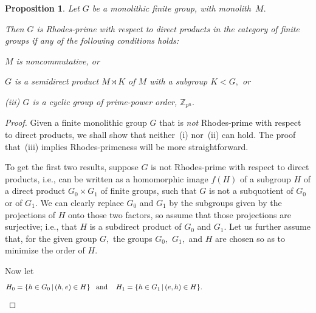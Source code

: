 \documentclass{amsart}
\newtheorem{proposition}[theorem]{Proposition}
\numberwithin{equation}{section}
\numberwithin{theorem}{section}
\newcommand{\Z}{\mathbb{Z}}
\begin{document}
\begin{proposition}\label{P.x-prime}
Let $G$ be a monolithic finite group, with monolith~$M.$

Then $G$ is Rhodes-prime with respect to direct products
in the category of finite groups if any
of the following conditions holds:

\hspace{.5em}{\rm(i)} $M$ is noncommutative, or

\hspace{.25em}{\rm(ii)} $G$ is a semidirect product
$M\rtimes K$ of $M$ with a subgroup $K<G,$ or

{\rm(iii)} $G$ is a cyclic group of prime-power order, $\Z_{p^n}.$
\end{proposition}

\begin{proof}
Given a finite monolithic
group $G$ that is {\em not} Rhodes-prime with respect to
direct products, we shall show that neither~(i) nor~(ii) can hold.
The proof that~(iii) implies Rhodes-primeness will be more
straightforward.

To get the first two results, suppose $G$
is not Rhodes-prime with respect to direct products, i.e.,
can be written as a homomorphic image $f(H)$ of a subgroup $H$ of
a direct product $G_0\times G_1$ of finite groups, such that
$G$ is not a subquotient of $G_0$ or of $G_1.$
We can clearly replace $G_0$ and $G_1$ by
the subgroups given by the projections of $H$ onto those two factors,
so assume that those projections are
surjective; i.e., that $H$ is a subdirect product of $G_0$ and $G_1.$
Let us further assume that, for the given
group $G,$ the groups $G_0,$ $G_1,$ and $H$ are chosen so
as to minimize the order of $H.$

Now let
%
\begin{equation}\begin{minipage}[c]{35pc}\label{d.H12}
$H_0 = \{h\in G_0\,|\,(h,e)\in H\}$\hspace{.8em}and\hspace{.8em}\
$H_1 = \{h\in G_1\,|\,(e,h)\in H\}.$
\end{minipage}\end{equation}


\end{proof}
\end{document}
